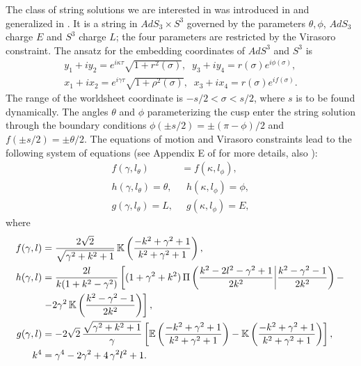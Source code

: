 The class of string solutions we are interested in was introduced in \cite{Correa:2012hh} and generalized in \cite{Gromov:2012eu}. It is a string in $AdS_3\times S^3$ governed by the parameters $\theta,\phi$, $AdS_3$ charge $E$ and $S^3$ charge $L$; the four parameters are restricted by the Virasoro constraint. The ansatz for the embedding coordinates of $AdS^3$ and $S^3$ is
\begin{align}
y_1+iy_2=e^{i\kappa\tau}\sqrt{1+r^2(\sigma)},\;\; y_3+iy_4=r(\sigma) e^{i\phi(\sigma)},\\
x_1+ix_2=e^{i\gamma\tau}\sqrt{1+\rho^2(\sigma)},\;\; x_3+ix_4=r(\sigma) e^{i f(\sigma)}.
\label{eq:embedding}
\end{align}
The range of the worldsheet coordinate is $-s/2<\sigma<s/2$, where $s$ is to be found dynamically. The angles $\theta$ and $ \phi$ parameterizing the cusp enter the string solution through the boundary conditions $\phi(\pm s/2)=\pm (\pi-\phi)/2$ and $f(\pm s/2)=\pm\theta/2$. The equations of motion and Virasoro constraints lead to the following system of equations (see Appendix E of \cite{Gromov:2012eu} for more details, also \cite{Drukker:2011za}):
\begin{align}
f(\gamma,l_\theta)&=f(\kappa,l_{\phi}),
\label{eq:ff}
\\
h(\gamma,l_{\theta})=\theta, &\;\; h(\kappa,l_{\phi})=\phi,
\label{eq:hh}
\\
g(\gamma,l_\theta)=L, &\;\; g(\kappa,l_\phi)=E,\label{eq:gg}
\end{align}
where
\begin{align}
f(\gamma,l)&=\frac{2\sqrt{2}}{\sqrt{\gamma^2+k^2+1}}\,\mathbb{K}\left(\frac{-k^2+\gamma^2+1}{k^2+\gamma^2+1}\right),
\label{eq:f}
\\
h(\gamma,l)&=\frac{2l}{k(1+k^2-\gamma^2)}\left[(1+\gamma^2+k^2)\,\Pi\left(\frac{k^2-2l^2-\gamma^2+1}{2k^2}\,\vline\,\frac{k^2-\gamma^2-1}{2k^2}\right)-\right.
\nonumber
\\ & \left.-2\gamma^2\,\mathbb{K}\left(\frac{k^2-\gamma^2-1}{2k^2}\right)\right],
\label{eq:h}
\\
g(\gamma,l)&=-2\sqrt{2} \, \frac{\sqrt{\gamma^2+k^2+1}}{\gamma}\left[\mathbb{E}\left(\frac{-k^2+\gamma^2+1}{k^2+\gamma^2+1}
\right)-\mathbb{K}\left(\frac{-k^2+\gamma^2+1}{k^2+\gamma^2+1}
\right)\right],
\label{eq:g}
\\
k^4&=\gamma^4-2 \gamma^2+ 4\, \gamma^2 l^2+1.
\nonumber
\end{align}

